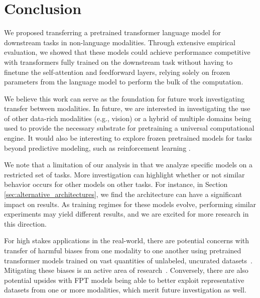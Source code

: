 
\section{Conclusion}

We proposed transferring a pretrained transformer language model for downstream tasks in non-language modalities.
Through extensive empirical evaluation, we showed that these models could achieve performance competitive with transformers fully trained on the downstream task without having to finetune the self-attention and feedforward layers, relying solely on frozen parameters from the language model to perform the bulk of the computation.

We believe this work can serve as the foundation for future work investigating transfer between modalities.
In future, we are interested in investigating the use of other data-rich modalities (e.g., vision) or a hybrid of multiple domains being used to provide the necessary substrate for pretraining a universal computational engine.
It would also be interesting to explore frozen pretrained models for tasks beyond predictive modeling, such as reinforcement learning \citep{abramson2020imitating}.

We note that a limitation of our analysis in that we analyze specific models on a restricted set of tasks.
More investigation can highlight whether or not similar behavior occurs for other models on other tasks.
For instance, in Section \ref{sec:alternative_architectures}, we find the architecture can have a significant impact on results.
As training regimes for these models evolve, performing similar experiments may yield different results, and we are excited for more research in this direction.

For high stakes applications in the real-world, there are potential concerns with transfer of harmful biases from one modality to one another using pretrained transformer models trained on vast quantities of unlabeled, uncurated datasets~\citep{sheng2019woman,bender2021dangers}.
Mitigating these biases is an active area of research~\citep{grover2019bias,choi2020fair}.
Conversely, there are also potential upsides with FPT models being able to better exploit representative datasets from one or more modalities, which merit future investigation as well.
